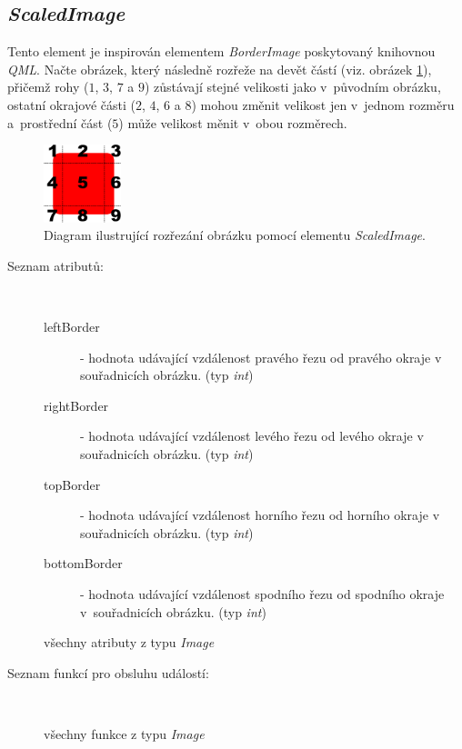 \documentclass[11pt,twoside,a4paper]{book}
\begin{document}
\subsection{\label{SEC:scaled}\textit{ScaledImage}}
Tento element je inspirován elementem \textit{BorderImage} poskytovaný knihovnou \textit{QML}. Načte obrázek, který následně rozřeže na devět částí (viz. obrázek \ref{fig:cut}), přičemž rohy ($1$, $3$, $7$ a $9$) zůstávají stejné velikosti jako v~původním obrázku, ostatní okrajové části ($2$, $4$, $6$ a $8$) mohou změnit velikost jen v~jednom rozměru a~prostřední část ($5$) může velikost měnit v~obou rozměrech.\\
\begin{figure}[!ht]
\begin{center}
  \includegraphics[width=0.2\textwidth]{imgCut}
\caption{{\label{fig:cut}}Diagram ilustrující rozřezání obrázku pomocí elementu \textit{ScaledImage}. \cite{bib:borderedImage}}
\end{center}
\end{figure}
\begin{description}
\item[Seznam atributů:] ~
\begin{description}
\item[leftBorder] - hodnota udávající vzdálenost pravého řezu od pravého okraje v souřadnicích obrázku. (typ \textit{int})
\item[rightBorder] - hodnota udávající vzdálenost levého řezu od levého okraje v souřadnicích obrázku. (typ \textit{int})
\item[topBorder] - hodnota udávající vzdálenost horního řezu od horního okraje v souřadnicích obrázku. (typ \textit{int})
\item[bottomBorder] - hodnota udávající vzdálenost spodního řezu od spodního okraje v~souřadnicích obrázku. (typ \textit{int})
\item[všechny atributy z typu \textit{Image}]
\end{description}
\item[Seznam funkcí pro obsluhu událostí:] ~
\begin{description}
\item[všechny funkce z typu \textit{Image}]
\end{description}
\end{description}
\end{document}
